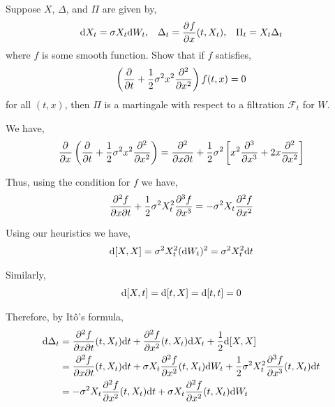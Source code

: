\begin{problem}[Exercise 8.3]
Suppose \( X \), \( \Delta \), and \( \Pi \) are given by,
\begin{align*}
    \d X_t = \sigma X_t \d W_t, 
    && \Delta_t = \pp{f}{x} (t,X_t),
    && \Pi_t = X_t \Delta_t
\end{align*}
where \( f \) is some smooth function. Show that if \( f \) satisfies,
\begin{align*}
    \left( \pp{}{t} + \dfrac{1}{2}\sigma^2x^2 \pp[2]{}{x} \right) f(t,x) = 0
\end{align*}
    for all \( (t,x) \), then \( \Pi \) is a martingale with respect to a filtration \( \mathcal{F}_t \) for \( W \).
\end{problem}


\begin{solution}[Solution]
We have,
\begin{align*}
    \pp{}{x} \left( \pp{}{t} + \dfrac{1}{2}\sigma^2x^2 \pp[2]{}{x}\right)  
    = \dfrac{\partial^2}{\partial x\partial t} + \dfrac{1}{2}\sigma^2 \left[ x^2 \pp[3]{}{x} + 2x \pp[2]{}{x} \right]
\end{align*}

Thus, using the condition for \( f \) we have,
\begin{align*}
    \dfrac{\partial^2 f}{\partial x\partial t} + \dfrac{1}{2}\sigma^2 X_t^2 \pp[3]{f}{x} = - \sigma^2 X_t \pp[2]{f}{x}
\end{align*}

Using our heuristics we have,
\begin{align*}
    \d[X,X] = \sigma^2 X_t^2 (\d W_t)^2 = \sigma^2 X_t^2 \d t
\end{align*}

Similarly, 
\begin{align*}
    \d[X,t] = \d[t,X] = \d[t,t] = 0
\end{align*}

Therefore, by It\^o's formula,
\begin{align*}
    \d \Delta_t &= \dfrac{\partial^2 f}{\partial x\partial t}(t,X_t) \d t + \pp[2]{f}{x}(t,X_t) \d X_t + \dfrac{1}{2} \d[X,X]
    \\&=  \dfrac{\partial^2 f}{\partial x\partial t}(t,X_t) \d t + \sigma X_t \pp[2]{f}{x}(t,X_t) \d W_t + \dfrac{1}{2}\sigma^2X_t^2 \pp[3]{f}{x}(t,X_t) \d t
    \\&= -\sigma^2 X_t \pp[2]{f}{x}(t,X_t) \d t + \sigma X_t \pp[2]{f}{x}(t,X_t)\d W_t 
\end{align*}


\end{solution}
